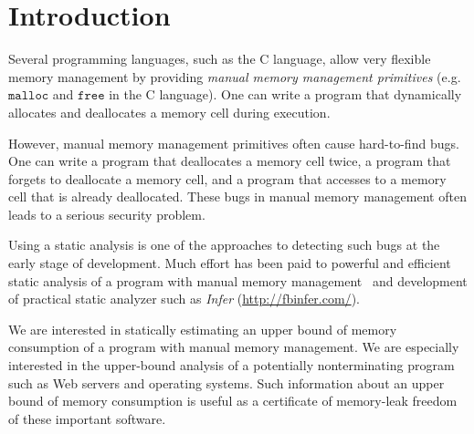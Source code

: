 \section{Introduction}
\label{sec:introduction}

Several programming languages, such as the C language, allow very
flexible memory management by providing \emph{manual memory management
primitives} (e.g. \(\mathtt{malloc}\) and \(\mathtt{free}\) in the C
language).  One can write a program that dynamically allocates and
deallocates a memory cell during execution.

However, manual memory management primitives often cause hard-to-find
bugs.  One can write a program that deallocates a memory cell twice, a
program that forgets to deallocate a memory cell, and a program that
accesses to a memory cell that is already deallocated.  These bugs in
manual memory management often leads to a serious security problem.

Using a static analysis is one of the approaches to detecting such bugs
at the early stage of development.  Much effort has been paid to
powerful and efficient static analysis of a program with manual memory
management~\cite{DBLP:conf/aplas/SuenagaK09,DBLP:conf/pldi/HeineL03,DBLP:conf/sigsoft/XieA05,DBLP:journals/scp/SwamyHMGJ06,DBLP:conf/sas/OrlovichR06,DBLP:conf/issta/SuiYX12}
and development of practical static analyzer such as \emph{Infer}
(\url{http://fbinfer.com/}).

We are interested in statically estimating an upper bound of memory
consumption of a program with manual memory management.  We are
especially interested in the upper-bound analysis of a potentially
nonterminating program such as Web servers and operating systems.  Such
information about an upper bound of memory consumption is useful as a
certificate of memory-leak freedom of these important software.


